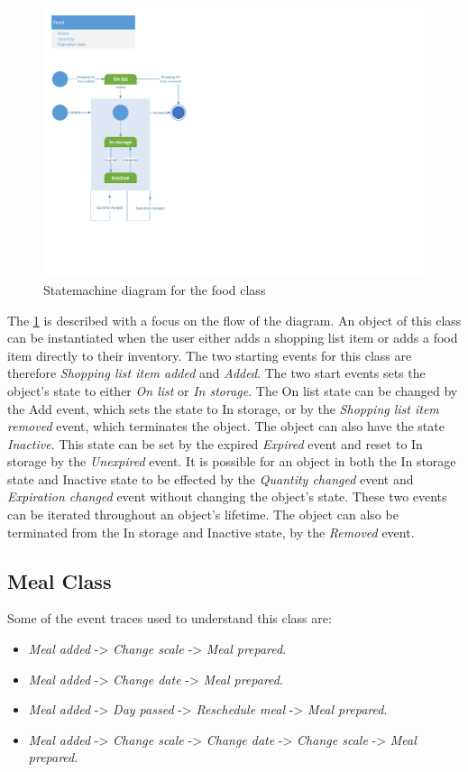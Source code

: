 \begin{figure}[tbhp]
	\centering
	\includegraphics[clip=true, trim=0.5cm 4cm 18.5cm 0.5cm,  ]{Grafik/FoodPlanner/Food.pdf}
	\caption{Statemachine diagram for the food class} \label{FoodClass}
\end{figure}
The \cref{FoodClass} is described with a focus on the flow of the diagram.
An object of this class can be instantiated when the user either adds a shopping list item or adds a food item directly to their inventory. The two starting events for this class are therefore \textit{Shopping list item added} and \textit{Added}. The two start events sets the object's state to either \textit{On list} or \textit{In storage}. The On list state can be changed by the Add event, which sets the state to In storage, or by the \textit{Shopping list item removed} event, which terminates the object. The object can also have the state \textit{Inactive}. This state can be set by the expired \textit{Expired} event and reset to In storage by the \textit{Unexpired} event. It is possible for an object in both the In storage state and Inactive state to be effected by the \textit{Quantity changed} event and \textit{Expiration changed} event without changing the object's state. These two events can be iterated throughout an object's lifetime. The object can also be terminated from the In storage and Inactive state, by the \textit{Removed} event.   

\subsection{Meal Class}
Some of the event traces used to understand this class are:
\begin{itemize}
	\item \textit{Meal added} -> \textit{Change scale} -> \textit{Meal prepared}.
	\item \textit{Meal added} -> \textit{Change date} -> \textit{Meal prepared}.
	\item \textit{Meal added} -> \textit{Day passed} ->\textit{ Reschedule meal} -> \textit{Meal prepared}.
	\item \textit{Meal added} -> \textit{Change scale} -> \textit{Change date} -> \textit{Change scale} -> \textit{Meal prepared}.
\end{itemize}

